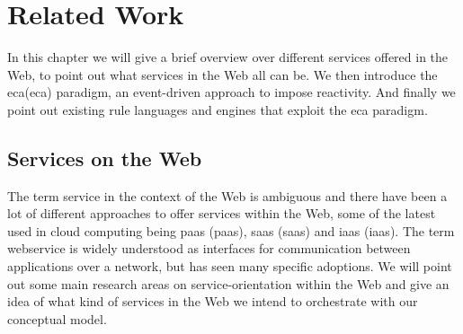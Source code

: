 
\chapter{Related Work}

In this chapter we will give a brief overview over different services offered in the Web, to point out what services in the Web all can be.
We then introduce the \textrm{\acrlong{eca}(\acrshort{eca})} paradigm, an event-driven approach to impose reactivity.
And finally we point out existing rule languages and engines that exploit the \textrm{\acrshort{eca}} paradigm.

\section{Services on the Web}
The term service in the context of the Web is ambiguous and there have been a lot of different approaches to offer services within the Web, some of the latest used in cloud computing being \textrm{\acrlong{paas} (\acrshort{paas})}, \textrm{\acrlong{saas} (\acrshort{saas})} and \textrm{\acrlong{iaas} (\acrshort{iaas})}.
The term \textrm{\gls{webservice}} is widely understood as interfaces for communication between applications over a network, but has seen many specific adoptions.
We will point out some main research areas on service-orientation within the Web and give an idea of what kind of services in the Web we intend to orchestrate with our conceptual model.

